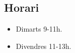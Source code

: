 \documentclass[../main.tex]{subfiles}
\begin{document}
\subsection*{Horari}
\begin{itemize}
    \item Dimarts 9-11h.
    \item Divendres 11-13h.
\end{itemize}
\end{document}
